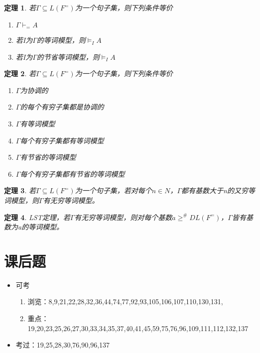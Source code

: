 \documentclass[a4paper]{ctexart}
\newtheorem{thm}{\hspace{2em}定理}[subsection]
\begin{document}
\begin{thm}
  若$\Gamma\subseteq L(F^=)$为一个句子集，则下列条件等价
  \begin{enumerate}[itemindent=2em]
    \item $\Gamma\vdash_=A$
    \item 若I为$\Gamma$的等词模型，则$\models_IA$
    \item 若I为$\Gamma$的节省等词模型，则$\models_IA$
  \end{enumerate}
\end{thm}

\begin{thm}
  若$\Gamma\subseteq L(F^=)$为一个句子集，则下列条件等价
  \begin{enumerate}[itemindent=2em]
    \item $\Gamma$为协调的
    \item $\Gamma$的每个有穷子集都是协调的
    \item $\Gamma$有等词模型
    \item $\Gamma$每个有穷子集都有等词模型
    \item $\Gamma$有节省的等词模型
    \item $\Gamma$每个有穷子集都有节省的等词模型
  \end{enumerate}
\end{thm}

\begin{thm}
    若$\Gamma\subseteq L(F^=)$为一个句子集，若对每个$n\in N$，$\Gamma$都有基数大于n的又穷等词模型，则$\Gamma$有无穷等词模型。
\end{thm}

\begin{thm}
  LST定理，若$\Gamma$有无穷等词模型，则对每个基数$a\geq ^\#DL(F^=)$，$\Gamma$皆有基数为a的等词模型。
\end{thm}

\section{课后题}
\begin{itemize}
  \item 可考
  \begin{enumerate}
    \item 浏览：8,9,21,22,28,32,36,44,74,77,92,93,105,106,107,110,130,131,
    \item 重点：19,20,23,25,26,27,30,33,34,35,37,40,41,45,59,75,76,96,109,111,112,132,137
  \end{enumerate}
  \item 考过：19,25,28,30,76,90,96,137
\end{itemize}
\end{document}
